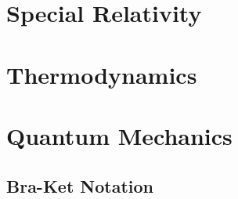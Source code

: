 \documentclass[a4paper, titlepage]{book}
\begin{document}
\frontmatter

\tableofcontents \label{contents}

\mainmatter



\part{Special Relativity}



\part{Thermodynamics}




\part{Quantum Mechanics}




\appendix

\chapter{Bra-Ket Notation}

\backmatter

\end{document}
